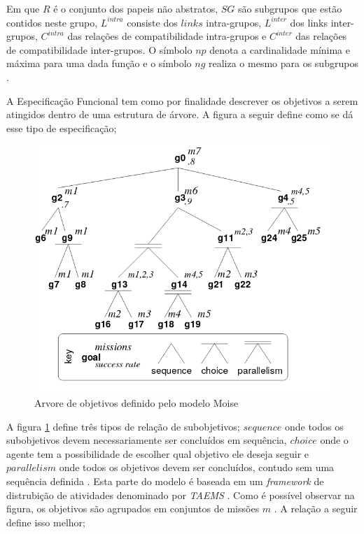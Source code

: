 Em que $R$ é o conjunto dos papeis não abstratos, $SG$ são subgrupos que estão contidos neste grupo, $L^{intra}$ consiste dos $links$ intra-grupos, $L^{inter}$ dos links inter-grupos, 
$C^{intra}$ das relações de compatibilidade intra-grupos e $C^{inter}$ das relações de compatibilidade inter-grupos. O símbolo $np$ denota a cardinalidade mínima e máxima para uma dada 
função e o símbolo $ng$ realiza o mesmo para os subgrupos \cite{moiseframework}. 

A Especificação Funcional tem como por finalidade descrever os objetivos a serem atingidos dentro de uma estrutura de árvore. A figura a seguir define como se dá esse tipo de especificação; 

\begin{figure}[H]
  \centering
  \includegraphics[width=0.8\linewidth]{figure/figmoise} 
  \caption{Arvore de objetivos definido pelo modelo Moise \cite{moiseframework}}
  \label{arvoremoise}
\end{figure}

A figura \ref{arvoremoise} define três tipos de relação de subobjetivos; $sequence$ onde todos os subobjetivos devem necessariamente ser concluídos em sequência, $choice$ onde o agente tem a 
possibilidade de escolher qual objetivo ele deseja seguir e $parallelism$ onde todos os objetivos devem ser concluídos, contudo sem uma sequência definida \cite{taems01} \cite{taems02}. Esta
parte do modelo é baseada em um \textit{framework} de distrubição de atividades denominado por \textit{TAEMS} \cite{TAEMS}.
Como é possível observar na figura, os objetivos são agrupados em conjuntos de missões $m$ \cite{dynamicagenttemporalstruct}. A relação a seguir define isso melhor;

